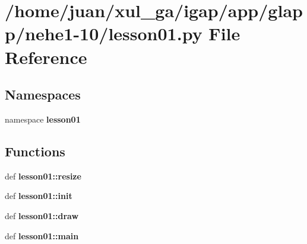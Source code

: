 \section{/home/juan/xul\_\-ga/igap/app/glapp/nehe1-10/lesson01.py File Reference}
\label{nehe1-10_2lesson01_8py}
\subsection*{Namespaces}
\begin{CompactItemize}
\item 
namespace {\bf lesson01}
\end{CompactItemize}
\subsection*{Functions}
\begin{CompactItemize}
\item 
def {\bf lesson01::resize}
\item 
def {\bf lesson01::init}
\item 
def {\bf lesson01::draw}
\item 
def {\bf lesson01::main}
\end{CompactItemize}
